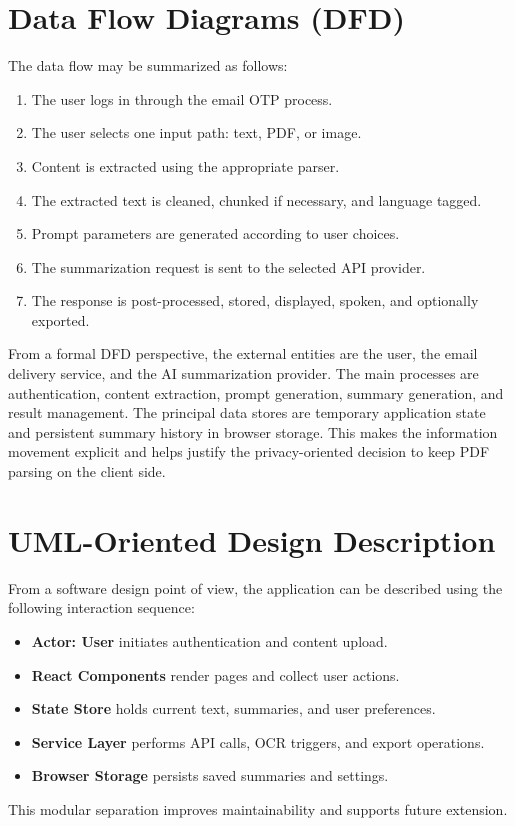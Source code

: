 \documentclass[12pt, a4paper]{report}
\begin{document}
\section{Data Flow Diagrams (DFD)}
The data flow may be summarized as follows:
\begin{enumerate}
  \item The user logs in through the email OTP process.
  \item The user selects one input path: text, PDF, or image.
  \item Content is extracted using the appropriate parser.
  \item The extracted text is cleaned, chunked if necessary, and language tagged.
  \item Prompt parameters are generated according to user choices.
  \item The summarization request is sent to the selected API provider.
  \item The response is post-processed, stored, displayed, spoken, and optionally exported.
\end{enumerate}

From a formal DFD perspective, the external entities are the user, the email delivery service, and the AI summarization provider. The main processes are authentication, content extraction, prompt generation, summary generation, and result management. The principal data stores are temporary application state and persistent summary history in browser storage. This makes the information movement explicit and helps justify the privacy-oriented decision to keep PDF parsing on the client side.

\section{UML-Oriented Design Description}
From a software design point of view, the application can be described using the following interaction sequence:
\begin{itemize}
  \item \textbf{Actor: User} initiates authentication and content upload.
  \item \textbf{React Components} render pages and collect user actions.
  \item \textbf{State Store} holds current text, summaries, and user preferences.
  \item \textbf{Service Layer} performs API calls, OCR triggers, and export operations.
  \item \textbf{Browser Storage} persists saved summaries and settings.
\end{itemize}
This modular separation improves maintainability and supports future extension.
\end{document}
